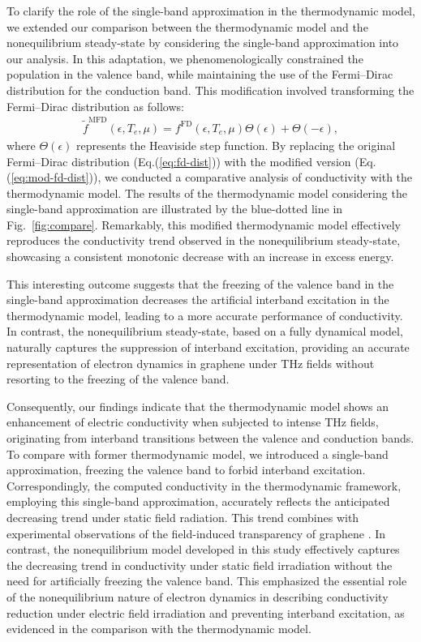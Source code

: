 To clarify the role of the single-band approximation in the thermodynamic model, we extended our comparison between the thermodynamic model and the nonequilibrium steady-state by considering the single-band approximation into our analysis. In this adaptation, we phenomenologically constrained the population in the valence band, while maintaining the use of the Fermi--Dirac distribution for the conduction band. This modification involved transforming the Fermi--Dirac distribution as follows:
\begin{align}
	\tilde f^{\mathrm{MFD}}(\epsilon, T_e, \mu)=f^{\mathrm{FD}}(\epsilon, T_e, \mu)\Theta(\epsilon)+\Theta(-\epsilon),
	\label{eq:mod-fd-dist}
\end{align}
where $\Theta(\epsilon)$ represents the Heaviside step function. By replacing the original Fermi--Dirac distribution (Eq.(\ref{eq:fd-dist})) with the modified version (Eq.(\ref{eq:mod-fd-dist})), we conducted a comparative analysis of conductivity with the thermodynamic model. The results of the thermodynamic model considering the single-band approximation are illustrated by the blue-dotted line in Fig.~\ref{fig:compare}. Remarkably, this modified thermodynamic model effectively reproduces the conductivity trend observed in the nonequilibrium steady-state, showcasing a consistent monotonic decrease with an increase in excess energy.

This interesting outcome suggests that the freezing of the valence band in the single-band approximation decreases the artificial interband excitation in the thermodynamic model, leading to a more accurate performance of conductivity. In contrast, the nonequilibrium steady-state, based on a fully dynamical model, naturally captures the suppression of interband excitation, providing an accurate representation of electron dynamics in graphene under THz fields without resorting to the freezing of the valence band.

Consequently, our findings indicate that the thermodynamic model shows an enhancement of electric conductivity when subjected to intense THz fields, originating from interband transitions between the valence and conduction bands. To compare with former thermodynamic model\cite{kovalev2021electrical}, we introduced a single-band approximation, freezing the valence band to forbid interband excitation. Correspondingly, the computed conductivity in the thermodynamic framework, employing this single-band approximation, accurately reflects the anticipated decreasing trend under static field radiation. This trend combines with experimental observations of the field-induced transparency of graphene \cite{Hwang2013, Paul_2013, doi:10.1063/1.4902999}. In contrast, the nonequilibrium model developed in this study effectively captures the decreasing trend in conductivity under static field irradiation without the need for artificially freezing the valence band. This emphasized the essential role of the nonequilibrium nature of electron dynamics in describing conductivity reduction under electric field irradiation and preventing interband excitation, as evidenced in the comparison with the thermodynamic model.
